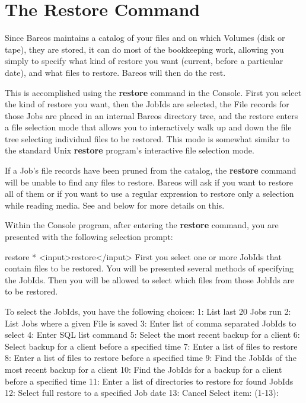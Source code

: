 \section{The Restore Command}

Since Bareos maintains a catalog of your files and on which Volumes (disk or
tape), they are stored, it can do most of the bookkeeping work, allowing you
simply to specify what kind of restore you want (current, before a particular
date), and what files to restore. Bareos will then do the rest.

This is accomplished using the {\bf restore} command in the Console. First you
select the kind of restore you want, then the JobIds are selected,
the File records for those Jobs are placed in an internal Bareos directory
tree, and the restore enters a file selection mode that allows you to
interactively walk up and down the file tree selecting individual files to be
restored. This mode is somewhat similar to the standard Unix {\bf restore}
program's interactive file selection mode.

If a Job's file records have been pruned from the catalog, the {\bf restore}
command will be unable to find any files to restore. Bareos will ask if you
want to restore all of them or if you want to use a regular expression to
restore only a selection while reading media.
See  and below for more details on this.

Within the Console program, after entering the {\bf restore} command, you are
presented with the following selection prompt:

\begin{bconsole}{restore}
* <input>restore</input>
First you select one or more JobIds that contain files
to be restored. You will be presented several methods
of specifying the JobIds. Then you will be allowed to
select which files from those JobIds are to be restored.

To select the JobIds, you have the following choices:
     1: List last 20 Jobs run
     2: List Jobs where a given File is saved
     3: Enter list of comma separated JobIds to select
     4: Enter SQL list command
     5: Select the most recent backup for a client
     6: Select backup for a client before a specified time
     7: Enter a list of files to restore
     8: Enter a list of files to restore before a specified time
     9: Find the JobIds of the most recent backup for a client
    10: Find the JobIds for a backup for a client before a specified time
    11: Enter a list of directories to restore for found JobIds
    12: Select full restore to a specified Job date
    13: Cancel
Select item:  (1-13):
\end{bconsole}

